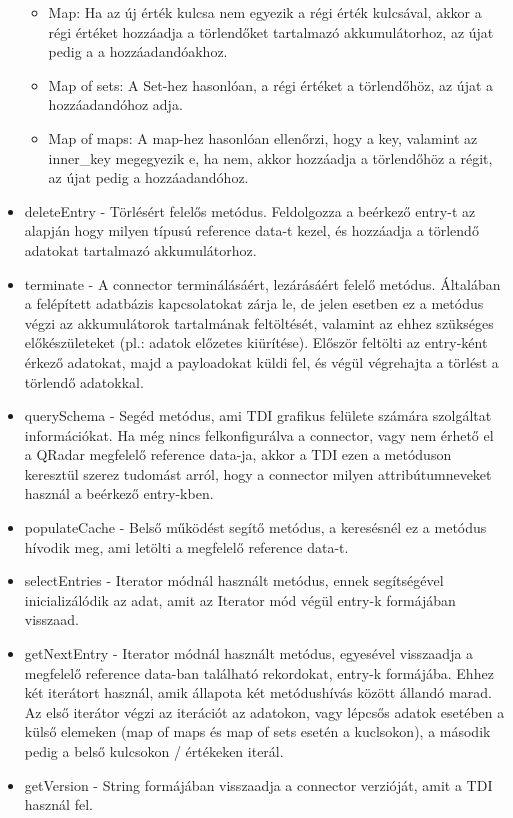 \begin{itemize}
\begin{itemize}
		\item Map: Ha az új érték kulcsa nem egyezik a régi érték kulcsával, akkor a régi értéket hozzáadja a törlendőket tartalmazó akkumulátorhoz, az újat pedig a a hozzáadandóakhoz.
		
		\item Map of sets: A Set-hez hasonlóan, a régi értéket a törlendőhöz, az újat a hozzáadandóhoz adja.
		
		\item Map of maps: A map-hez hasonlóan ellenőrzi, hogy a key, valamint az inner\_key megegyezik e, ha nem, akkor hozzáadja a törlendőhöz a régit, az újat pedig a hozzáadandóhoz.
	\end{itemize}

	\item deleteEntry - Törlésért felelős metódus. Feldolgozza a beérkező entry-t az alapján hogy milyen típusú reference data-t kezel, és hozzáadja a törlendő adatokat tartalmazó akkumulátorhoz.
	
	\item terminate - A connector terminálásáért, lezárásáért felelő metódus. Általában a felépített adatbázis kapcsolatokat zárja le, de jelen esetben ez a metódus végzi az akkumulátorok tartalmának feltöltését, valamint az ehhez szükséges előkészületeket (pl.: adatok előzetes kiürítése). Először feltölti az entry-ként érkező adatokat, majd a payloadokat küldi fel, és végül végrehajta a törlést a törlendő adatokkal.
	
	\item querySchema - Segéd metódus, ami TDI grafikus felülete számára szolgáltat információkat. Ha még nincs felkonfigurálva a connector, vagy nem érhető el a QRadar megfelelő reference data-ja, akkor a TDI ezen a metóduson keresztül szerez tudomást arról, hogy a connector milyen attribútumneveket használ a beérkező entry-kben.
	
	\item populateCache - Belső működést segítő metódus, a keresésnél ez a metódus hívodik meg, ami letölti a megfelelő reference data-t.
	
	\item selectEntries - Iterator módnál használt metódus, ennek segítségével inicializálódik az adat, amit az Iterator mód végül entry-k formájában visszaad.
	
	\item getNextEntry - Iterator módnál használt metódus, egyesével visszaadja a megfelelő reference data-ban található rekordokat, entry-k formájába. Ehhez két iterátort használ, amik állapota két metódushívás között állandó marad. Az első iterátor végzi az iterációt az adatokon, vagy lépcsős adatok esetében a külső elemeken (map of maps és map of sets esetén a kuclsokon), a második pedig a belső kulcsokon / értékeken iterál.
	
	\item getVersion - String formájában visszaadja a connector verzióját, amit a TDI használ fel.
\end{itemize}

